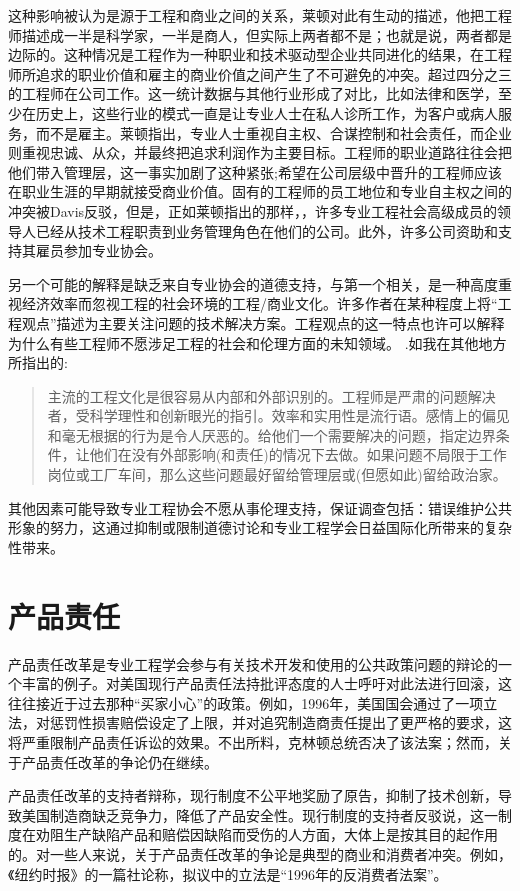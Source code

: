 \documentclass[lang=cn,11pt,a4paper]{elegantpaper}
\begin{document}
这种影响被认为是源于工程和商业之间的关系，莱顿对此有生动的描述，\cite{12}他把工程师描述成一半是科学家，一半是商人，但实际上两者都不是；也就是说，两者都是边际的。这种情况是工程作为一种职业和技术驱动型企业共同进化的结果，在工程师所追求的职业价值和雇主的商业价值之间产生了不可避免的冲突。超过四分之三的工程师在公司工作。这一统计数据与其他行业形成了对比，比如法律和医学，至少在历史上，这些行业的模式一直是让专业人士在私人诊所工作，为客户或病人服务，而不是雇主。莱顿指出，专业人士重视自主权、合谋控制和社会责任，而企业则重视忠诚、从众，并最终把追求利润作为主要目标。工程师的职业道路往往会把他们带入管理层，这一事实加剧了这种紧张;希望在公司层级中晋升的工程师应该在职业生涯的早期就接受商业价值。固有的工程师的员工地位和专业自主权之间的冲突被Davis反驳\cite{14}，但是，正如莱顿指出的那样，\cite{12}，许多专业工程社会高级成员的领导人已经从技术工程职责到业务管理角色在他们的公司。此外，许多公司资助和支持其雇员参加专业协会。

另一个可能的解释是缺乏来自专业协会的道德支持，与第一个相关，是一种高度重视经济效率而忽视工程的社会环境的工程/商业文化。许多作者在某种程度上将“工程观点”描述为主要关注问题的技术解决方案。工程观点的这一特点也许可以解释为什么有些工程师不愿涉足工程的社会和伦理方面的未知领域。\cite{9} .如我在其他地方所指出的:\cite{20}
\begin{quotation}
  主流的工程文化是很容易从内部和外部识别的。工程师是严肃的问题解决者，受科学理性和创新眼光的指引。效率和实用性是流行语。感情上的偏见和毫无根据的行为是令人厌恶的。给他们一个需要解决的问题，指定边界条件，让他们在没有外部影响(和责任)的情况下去做。如果问题不局限于工作岗位或工厂车间，那么这些问题最好留给管理层或(但愿如此)留给政治家。
\end{quotation}

其他因素可能导致专业工程协会不愿从事伦理支持，保证调查包括：错误维护公共形象的努力，这通过抑制或限制道德讨论和专业工程学会日益国际化所带来的复杂性带来。

\section{产品责任\cite{2,9}}
产品责任改革是专业工程学会参与有关技术开发和使用的公共政策问题的辩论的一个丰富的例子\cite{9}。对美国现行产品责任法持批评态度的人士呼吁对此法进行回滚，这往往接近于过去那种“买家小心”的政策。例如，1996年，美国国会通过了一项立法，对惩罚性损害赔偿设定了上限，并对追究制造商责任提出了更严格的要求，这将严重限制产品责任诉讼的效果。不出所料，克林顿总统否决了该法案\cite{21}；然而，关于产品责任改革的争论仍在继续。

产品责任改革的支持者辩称，现行制度不公平地奖励了原告，抑制了技术创新，导致美国制造商缺乏竞争力，降低了产品安全性。现行制度的支持者反驳说，这一制度在劝阻生产缺陷产品和赔偿因缺陷而受伤的人方面，大体上是按其目的起作用的\cite{22}。对一些人来说，关于产品责任改革的争论是典型的商业和消费者冲突。例如，《纽约时报》的一篇社论称\cite{23}，拟议中的立法是“1996年的反消费者法案”。
\end{document}

